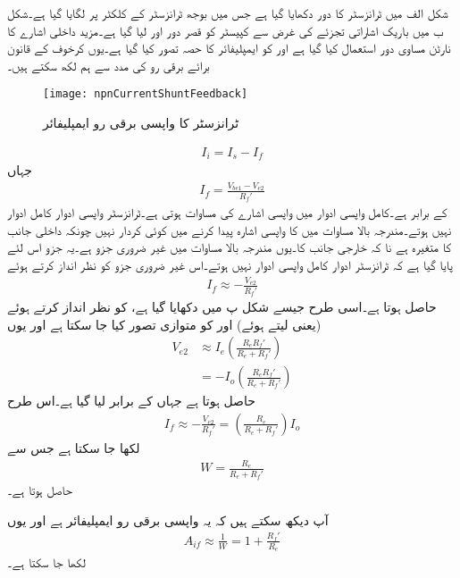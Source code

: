 شکل  الف میں ٹرانزسٹر کا دور دکھایا گیا ہے جس میں بوجھ  ٹرانزسٹر  کے  کلکٹر  پر لگایا گیا ہے۔شکل  ب میں باریک اشاراتی تجزئے کی غرض سے کپیسٹر کو قصر دور اور  لیا گیا ہے۔مزید داخلی اشارے کا نارٹن مساوی دور استعمال کیا گیا ہے اور  کو ایمپلیفائر کا حصہ تصور کیا گیا ہے۔یوں کرخوف کے قانون برائے برقی رو کی مدد سے ہم لکھ سکتے ہیں۔
\begin{figure}
\centering
\texttt{[image: npnCurrentShuntFeedback]}
\caption{ٹرانزسٹر کا واپسی برقی رو ایمپلیفائر}
\label{شکل_واپسی_ٹرانزسٹر_برقی_رو_ایمپلیفائر}
\end{figure}
%
\begin{align*} \label{مساوات_واپسی_ٹرانزسٹر_برقی_رو_ایمپلیفائر_واپسی_مساوات}
I_i=I_s-I_f
\end{align*}
جہاں
\begin{align*}
I_f=\frac{V_{be1}-V_{e2}}{R_f'}
\end{align*}
کے برابر ہے۔کامل واپسی ادوار میں واپسی اشارے کی مساوات  ہوتی ہے۔ٹرانزسٹر واپسی ادوار کامل ادوار نہیں ہوتے۔مندرجہ بالا مساوات میں   کا واپسی اشارہ پیدا کرنے میں کوئی کردار نہیں چونکہ  داخلی جانب کا متغیرہ ہے نا کہ خارجی جانب کا۔یوں مندرجہ بالا مساوات میں  غیر ضروری جزو ہے۔یہ جزو اس لئے پایا گیا ہے کہ ٹرانزسٹر ادوار کامل واپسی ادوار نہیں ہوتے۔اس غیر ضروری جزو کو نظر انداز کرتے ہوئے 
\begin{align*}
I_f \approx -\frac{V_{e2}}{R_f'}
\end{align*}
حاصل ہوتا ہے۔اسی طرح جیسے شکل  پ میں دکھایا گیا ہے،  کو نظر انداز  کرتے ہوئے (یعنی  لیتے ہوئے)  اور  کو متوازی تصور کیا جا سکتا ہے اور یوں
\begin{align*}
V_{e2} &\approx I_e \left (\frac{R_e R_f'}{R_e+R_f'}\right )\\
&=-I_o \left ( \frac{R_e R_f'}{R_e+R_f'}\right )
\end{align*}
حاصل ہوتا ہے جہاں  کے برابر لیا گیا ہے۔اس طرح
\begin{align*}
I_f \approx -\frac{V_{e2}}{R_f'}=\left(\frac{R_e}{R_e+R_f'} \right) I_o
\end{align*}
لکھا جا سکتا ہے  جس سے
\begin{align*}
W =\frac{R_e}{R_e+R_f'}
\end{align*}
حاصل ہوتا ہے۔

آپ دیکھ سکتے ہیں کہ یہ واپسی برقی رو ایمپلیفائر ہے اور یوں
\begin{align}
A_{if} \approx \frac{1}{W}=1+\frac{R_f'}{R_e}
\end{align}
لکھا جا سکتا ہے۔

